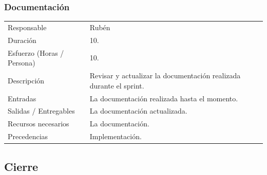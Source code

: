 \subsubsection{Documentaci\'{o}n}
\begin{table}[H]
    \begin{center}
        \begin{tabular}{l p{8cm}}
            Responsable                           & Rub\'{e}n \\
            Duraci\'{o}n                          & 10. \\ 
            Esfuerzo (Horas / Persona)            & 10. \\
            Descripci\'{o}n                       & Revisar y actualizar la documentaci\'{o}n realizada durante el sprint. \\
            Entradas                              & La documentaci\'{o}n realizada hasta el momento.\\
            Salidas / Entregables                 & La documentaci\'{o}n actualizada. \\
            Recursos necesarios                   & La documentaci\'{o}n. \\
            Precedencias                          & Implementaci\'{o}n. \\
        \end{tabular}
    \end{center}
    
\end{table}

\subsection{Cierre}
